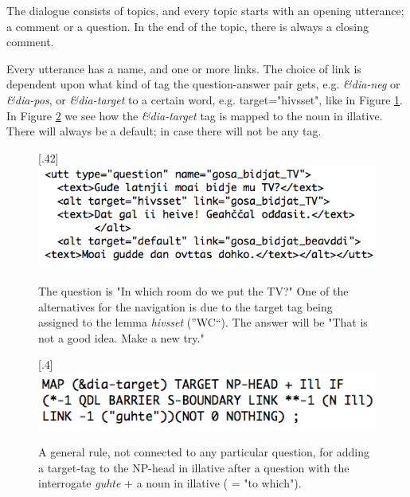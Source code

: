 \documentclass[11pt]{article}
\begin{document}

The dialogue consists of topics, and every topic starts with an opening utterance; a comment or a question. In the end of the topic, there is always a closing comment.  

Every utterance has a name, and one or more links. The choice of link is dependent upon what kind of tag the question-answer pair gets, e.g. \textit{\&dia-neg} or \textit{\&dia-pos}, or \textit{\&dia-target} to a certain word, e.g. target="hivsset", like in Figure \ref{TV}.  In Figure \ref{targetIll} we see how the \textit{\&dia-target} tag is mapped to the noun in illative. There will always be a default; in case there will not be any tag. \\

\begin{figure}[htbp]
\begin{center}
\scalebox{.40}[.42]{\includegraphics{presentation/img/gosabidjatTV2.png}}
\caption{The question is "In which room do we put the TV?" One of the alternatives for the navigation is due to the target tag being assigned to the lemma \textit{hivsset} (''WC``). The answer will be "That is not a good idea. Make a new try."}
\label{TV}
\end{center}
\end{figure}


\begin{figure}[htbp]
\begin{center}
\scalebox{.4}[.4]{\includegraphics{presentation/img/targetIll2.png}}
\caption{A general rule, not connected to any particular question, for adding a target-tag to the NP-head in illative after a question with the interrogate \textit{guhte} + a noun in illative ( = "to which").}
\label{targetIll}
\end{center}
\end{figure}
\end{document}

